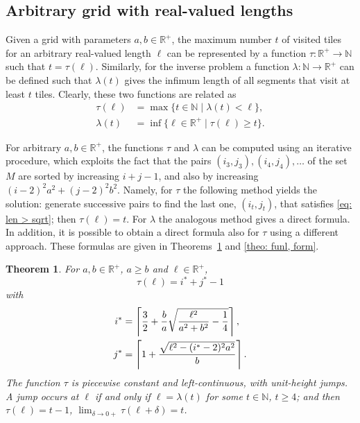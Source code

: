 \documentclass[12pt, a4paper]{article}
\newcommand{\st}{\mid}%
\let\Re\relax %
\DeclareMathOperator{\Re}{Re} %
\newcommand{\funt}{\tau} %
\newcommand{\funl}{\lambda} %
\newcommand{\len}{\ell} %
\newcommand{\tiles}{t} %
\newcommand{\isoli}{i^\ast}
\newcommand{\jsoli}{j^\ast}
\newcommand{\mss}{M}
\newtheorem{theorem}{Theorem}%
\begin{document}
\subsection{Arbitrary grid with real-valued lengths}
\label{part: max: arbitrary grid, real lengths}

Given a grid with parameters $a, b \in \mathbb R^+$, the maximum number $\tiles$ of visited tiles for an arbitrary real-valued length $\len$ can be represented by a function $\funt: \mathbb R^+ \to \mathbb N$ such that $\tiles = \funt(\len)$. Similarly, for the inverse problem a function $\funl: \mathbb N \to \mathbb R^+$ can be defined such that $\funl(\tiles)$ gives the infimum length of all segments that visit at least $\tiles$ tiles. Clearly, these two functions are related as
\begin{align}
\label{eq: funt funl}
\funt(\len) &= \max \{\tiles \in \mathbb N \st \funl(\tiles)<\len\},\\
\label{eq: funl funt}
\funl(\tiles) &= \inf\{\len \in \mathbb R^+ \st \funt(\len) \geq \tiles\}.
\end{align}

For arbitrary $a, b \in \mathbb R^+$, the functions $\funt$ and $\funl$ can be computed using an iterative procedure, which exploits the fact that the pairs $(i_3,j_3), (i_4,j_4), \ldots$ of the set $\mss$ are sorted by increasing $i+j-1$, and also by increasing $(i-2)^2 a^2 + (j-2)^2 b^2$. Namely, for $\funt$ the following method yields the solution: generate successive pairs to find the last one, $(i_\tiles,j_\tiles)$, that satisfies \eqref{eq: len > sqrt}; then $\funt(\len) = \tiles$. For $\funl$ the analogous method gives a direct formula. In addition, it is possible to obtain a direct formula also for $\funt$ using a different approach. These formulas are given in Theorems~\ref{theo: funt, form} and \ref{theo: funl, form}.

\begin{theorem}
\label{theo: funt, form}
For $a, b \in \mathbb R^+$, $a \geq b$ and $\len \in \mathbb R^+$,
\begin{equation}
\label{eq: theo: funt, form; funt}
\funt(\len) = \isoli+\jsoli-1
\end{equation}
with
\begin{align}
\label{eq: theo: funt, form; i}
\isoli &= \left\lceil \frac 3 2 + \frac b a \Re \sqrt{\frac{\len^2}{a^2+b^2}-\frac 1 4} \right\rceil, \\
\label{eq: theo: funt, form; j}
\jsoli &= \left\lceil 1 + \frac{\sqrt{\len^2-(\isoli-2)^2a^2}}{b} \right\rceil.
\end{align}
The function $\funt$ is piecewise constant and left-continuous, with unit-height jumps. A jump occurs at $\len$ if and only if $\len = \funl(\tiles)$ for some $\tiles \in \mathbb N$, $\tiles \geq 4$; and then $\funt(\len) = \tiles-1$, $\lim_{\delta \rightarrow 0+} \funt(\len+\delta) = \tiles$.
\end{theorem}
\end{document}
